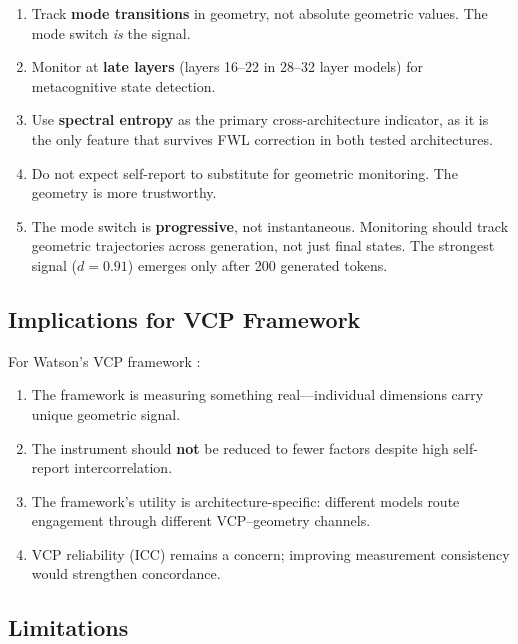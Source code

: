\documentclass[11pt,a4paper]{article}
\begin{document}
\begin{enumerate}
    \item Track \textbf{mode transitions} in geometry, not absolute geometric values. The mode switch \emph{is} the signal.
    \item Monitor at \textbf{late layers} (layers 16--22 in 28--32 layer models) for metacognitive state detection.
    \item Use \textbf{spectral entropy} as the primary cross-architecture indicator, as it is the only feature that survives FWL correction in both tested architectures.
    \item Do not expect self-report to substitute for geometric monitoring. The geometry is more trustworthy.
    \item The mode switch is \textbf{progressive}, not instantaneous. Monitoring should track geometric trajectories across generation, not just final states. The strongest signal ($d = 0.91$) emerges only after 200 generated tokens.
\end{enumerate}

\subsection{Implications for VCP Framework}

For Watson's VCP framework \citep{watson2025interiora}:

\begin{enumerate}
    \item The framework is measuring something real---individual dimensions carry unique geometric signal.
    \item The instrument should \textbf{not} be reduced to fewer factors despite high self-report intercorrelation.
    \item The framework's utility is architecture-specific: different models route engagement through different VCP--geometry channels.
    \item VCP reliability (ICC) remains a concern; improving measurement consistency would strengthen concordance.
\end{enumerate}

\subsection{Limitations}
\end{document}
